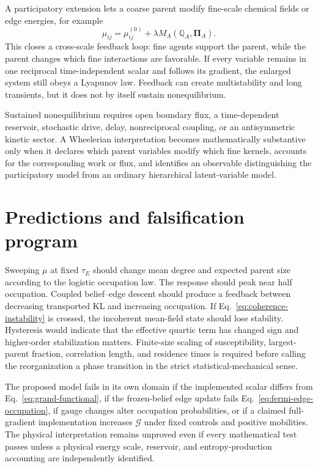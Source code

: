 \documentclass[11pt,letterpaper]{article}
\newcommand{\cG}{\mathcal G}
\begin{document}
A participatory extension lets a coarse parent modify fine-scale chemical fields or edge energies, for example
\begin{equation}
 \mu_{ij}=\mu_{ij}^{(0)}+\lambda M_A(\mathbb Q_A,\boldsymbol\Pi_A).
 \label{eq:participatory-field}
\end{equation}
This closes a cross-scale feedback loop: fine agents support the parent, while the parent changes which fine interactions are favorable.  If every variable remains in one reciprocal time-independent scalar and follows its gradient, the enlarged system still obeys a Lyapunov law.  Feedback can create multistability and long transients, but it does not by itself sustain nonequilibrium.

Sustained nonequilibrium requires open boundary flux, a time-dependent reservoir, stochastic drive, delay, nonreciprocal coupling, or an antisymmetric kinetic sector.  A Wheelerian interpretation becomes mathematically substantive only when it declares which parent variables modify which fine kernels, accounts for the corresponding work or flux, and identifies an observable distinguishing the participatory model from an ordinary hierarchical latent-variable model.

\section{Predictions and falsification program}

Sweeping $\mu$ at fixed $\tau_E$ should change mean degree and expected parent size according to the logistic occupation law.  The response should peak near half occupation.  Coupled belief--edge descent should produce a feedback between decreasing transported KL and increasing occupation.  If Eq.~\eqref{eq:coherence-instability} is crossed, the incoherent mean-field state should lose stability.  Hysteresis would indicate that the effective quartic term has changed sign and higher-order stabilization matters.  Finite-size scaling of susceptibility, largest-parent fraction, correlation length, and residence times is required before calling the reorganization a phase transition in the strict statistical-mechanical sense.

The proposed model fails in its own domain if the implemented scalar differs from Eq.~\eqref{eq:grand-functional}, if the frozen-belief edge update fails Eq.~\eqref{eq:fermi-edge-occupation}, if gauge changes alter occupation probabilities, or if a claimed full-gradient implementation increases $\cG$ under fixed controls and positive mobilities.  The physical interpretation remains unproved even if every mathematical test passes unless a physical energy scale, reservoir, and entropy-production accounting are independently identified.
\end{document}
